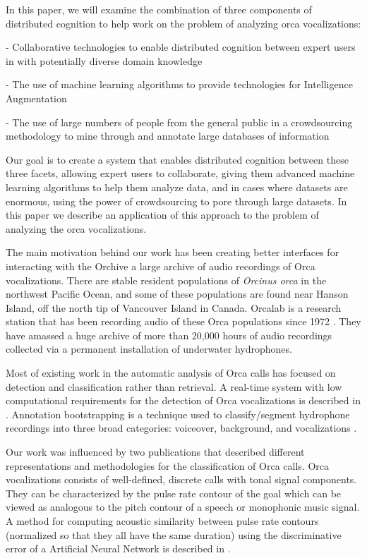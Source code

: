 \documentclass[12pt,oneside]{book}
\begin{document}
In this paper, we will examine the combination of three components of
distributed cognition to help work on the problem of analyzing orca
vocalizations:

- Collaborative technologies to enable distributed cognition between
expert users in with potentially diverse domain knowledge

- The use of machine learning algorithms to provide technologies for
Intelligence Augmentation

- The use of large numbers of people from the general public in a
crowdsourcing methodology to mine through and annotate large databases
of information

Our goal is to create a system that enables distributed cognition
between these three facets, allowing expert users to collaborate,
giving them advanced machine learning algorithms to help them analyze
data, and in cases where datasets are enormous, using the power of
crowdsourcing to pore through large datasets.  In this paper we
describe an application of this approach to the problem of analyzing
the orca vocalizations.

The main motivation behind our work has been creating better
interfaces for interacting with the Orchive \cite{tzanetakis07} a
large archive of audio recordings of Orca vocalizations.  There are
stable resident populations of \textit{Orcinus orca} in the northwest
Pacific Ocean, and some of these populations \cite{ford00} are found
near Hanson Island, off the north tip of Vancouver Island in
Canada. Orcalab is a research station that has been recording audio of
these Orca populations since 1972 \cite{deecke99}. They have amassed a
huge archive of more than 20,000 hours of audio recordings collected
via a permanent installation of underwater hydrophones.

Most of existing work in the automatic analysis of Orca calls has
focused on detection and classification rather than retrieval. A
real-time system with low computational requirements for the detection
of Orca vocalizations is described in \cite{Luke2010771}. Annotation
bootstrapping is a technique used to classify/segment hydrophone
recordings into three broad categories: voiceover, background, and
vocalizations \cite{ness08}.

Our work was influenced by two publications that described different 
representations and methodologies for the classification of Orca
calls. Orca vocalizations consists of well-defined, discrete calls
with tonal signal components. They can be characterized by the pulse
rate contour of the goal which can be viewed as analogous to the pitch
contour of a speech or monophonic music signal. A method for computing 
acoustic similarity between pulse rate contours (normalized so that
they all have the same duration) using the discriminative error of a
Artificial Neural Network is described in
\cite{deecke99}. 
\end{document}

